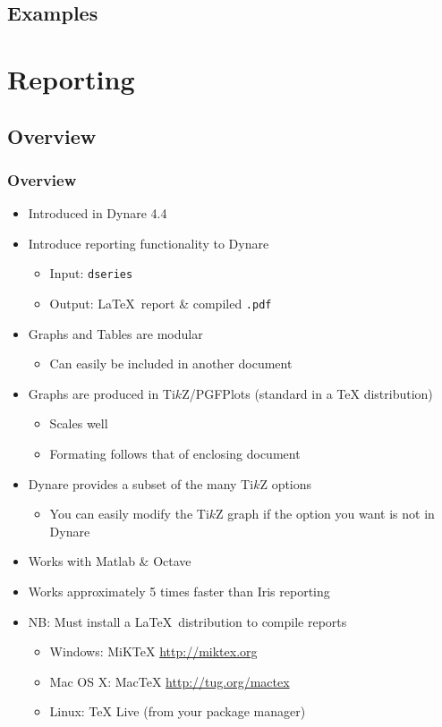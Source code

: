 \documentclass[10pt]{beamer}
\begin{document}
\subsection{Examples}




%
%
\section{Reporting}
\subsection{Overview}
\begin{frame}
  \frametitle{Overview}
  \begin{itemize}
  \item Introduced in Dynare 4.4
  \item Introduce reporting functionality to Dynare
      \begin{itemize}
      \item Input: \texttt{dseries}
      \item Output: \LaTeX\ report \& compiled \texttt{.pdf}
      \end{itemize}
    \item Graphs and Tables are modular
      \begin{itemize}
      \item Can easily be included in another document
      \end{itemize}
    \item Graphs are produced in Ti$k$Z/PGFPlots (standard in a TeX distribution)
      \begin{itemize}
      \item Scales well
      \item Formating follows that of enclosing document
      \end{itemize}
    \item Dynare provides a subset of the many Ti$k$Z options
      \begin{itemize}
      \item You can easily modify the Ti$k$Z graph if the option you want is not in Dynare
      \end{itemize}
    \item Works with Matlab \& Octave
    \item Works approximately 5 times faster than Iris reporting
    \item NB: Must install a \LaTeX\ distribution to compile reports
      \begin{itemize}
      \item Windows: MiKTeX \url{http://miktex.org}
      \item Mac OS X: MacTeX \url{http://tug.org/mactex}
      \item Linux: TeX Live (from your package manager)
      \end{itemize}
  \end{itemize}
\end{frame}
\end{document}
